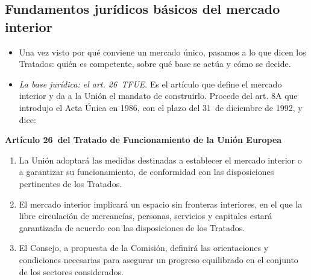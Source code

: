 \documentclass[11pt]{article}
\begin{document}
\subsection{Fundamentos jurídicos básicos del mercado interior}\label{sec:fundamentos}

\begin{itemize}
\item Una vez visto por qué conviene un mercado único, pasamos a lo que dicen los Tratados: quién es competente, sobre qué base se actúa y cómo se decide.
\item \emph{La base jurídica: el art. 26~TFUE}. Es el artículo que define el mercado interior y da a la Unión el mandato de construirlo. Procede del art. 8A que introdujo el Acta Única en 1986, con el plazo del 31~de diciembre de 1992, y dice\nocite{UE2016TFUE}:
\end{itemize}

\begin{ideaclave}
\textbf{Artículo 26~del Tratado de Funcionamiento de la Unión Europea}
\begin{enumerate}
\item La Unión adoptará las medidas destinadas a establecer el mercado interior o a garantizar su funcionamiento, de conformidad con las disposiciones pertinentes de los Tratados.
\item El mercado interior implicará un espacio sin fronteras interiores, en el que la libre circulación de mercancías, personas, servicios y capitales estará garantizada de acuerdo con las disposiciones de los Tratados.
\item El Consejo, a propuesta de la Comisión, definirá las orientaciones y condiciones necesarias para asegurar un progreso equilibrado en el conjunto de los sectores considerados.
\end{enumerate}
\end{ideaclave}
\end{document}
